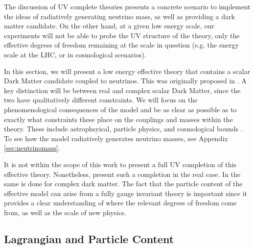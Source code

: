 The discussion of UV complete theories \cite{Farzan2009, Farzan2010, Farzan2010a} presents a concrete scenario to implement the ideas of radiatively generating neutrino mass, as well as providing a dark matter candidate. On the other hand, at a given low energy scale, our experiments will not be able to probe the UV structure of the theory, only the effective degrees of freedom remaining at the scale in question (e.g. the energy scale at the LHC, or in cosmological scenarios).

In this section, we will present a low energy effective theory that contains a scalar Dark Matter candidate coupled to neutrinos. This was originally proposed in \cite{Farzan2014, Farzan2011, Farzan2010, Boehm2006, Farzan2009}. A key distinction will be between real and complex scalar Dark Matter, since the two have qualitatively different constraints. We will focus on the phenomenological consequences of the model and be as clear as possible as to exactly what constraints these place on the couplings and masses within the theory. These include astrophsyical, particle physics, and cosmological bounds \cite{Farzan2014, Farzan2011, Farzan2010, Boehm2006, Farzan2009}. To see how the model radiatively generates neutrino masses, see Appendix \ref{sec:neutrinomass}.

It is not within the scope of this work to present a full UV completion of this effective theory. Nonetheless, \cite{Farzan2009, Farzan2010} present such a completion in the real case. In \cite{Farzan2010a} the same is done for complex dark matter. The fact that the particle content of the effective model can arise from a fully gauge invariant theory is important since it provides a clear understanding of where the relevant degrees of freedom come from, as well as the scale of new physics.

\subsection{Lagrangian and Particle Content}


